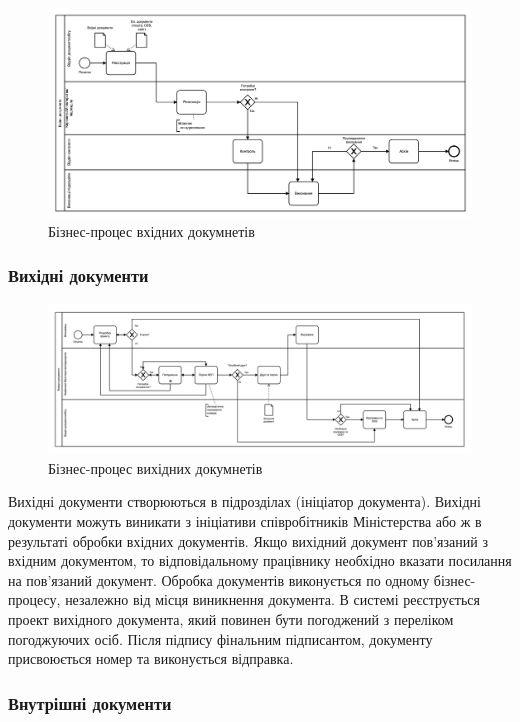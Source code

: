 \begin{figure}[!htbp]
\centerline{\includegraphics[scale=0.27]{inputDoc.png}}
\caption{Бізнес-процес вхідних докумнетів}
\end{figure}

\subsubsection{Вихідні документи}

\begin{figure}[!htbp]
\centerline{\includegraphics[scale=0.27]{outputDoc.png}}
\caption{Бізнес-процес вихідних докумнетів}
\end{figure}

Вихідні документи створюються в підрозділах (ініціатор документа).
Вихідні документи можуть виникати з ініціативи співробітників
Міністерства або ж в результаті обробки вхідних документів.
Якщо вихідний документ пов'язаний з вхідним документом, то
відповідальному працівнику необхідно вказати посилання на
пов'язаний документ. Обробка документів виконується по
одному бізнес-процесу, незалежно від місця виникнення документа.
В системі реєструється проект вихідного документа,
який повинен бути погоджений з переліком погоджуючих осіб.
Після підпису фінальним підписантом, документу присвоюється
номер та виконується відправка.

\subsubsection{Внутрішні документи}

